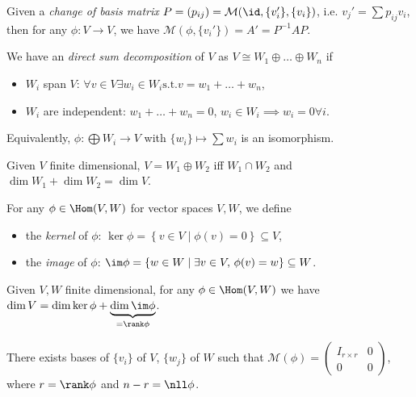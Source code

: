 \documentclass{notes}
\begin{document}
\begin{corollary}
    Given a \emph{change of basis matrix} $P=(p_{ij})=\mathcal{M} (\id, \{v_i'\}, \{v_i\})$, i.e. $v_j'=\sum p_{ij}v_i$, then for any $\phi \colon V \to V $, we have $\mathcal{M} (\phi ,\{v_i'\})=A'=P^{-1} AP $.
\end{corollary}

\begin{theorem}
    We have an \emph{direct sum decomposition} of $V$ as $V\cong W_1 \oplus \ldots \oplus W_n $ if

    \begin{itemize}
        \item $W_i$ span $V$: $\forall v\in V \exists w_i\in W_i \text{s.t.} v={w}_{1}+\ldots+{w}_{n} $,
        \item $W_i$ are independent: ${w}_{1}+\ldots+{w}_{n} =0$, $w_i\in W_i\implies w_i=0 \forall i$.
    \end{itemize}
    
    Equivalently, $\phi \colon \bigoplus W_i\to V$ with $\{w_i\}\mapsto \sum w_i$ is an isomorphism.
\end{theorem}

\begin{corollary}
    Given $V$ finite dimensional, $V=W_1\oplus W_2$ iff $W_1 \cap W_2$ and $\dim W_1+\dim W_2=\dim V$.
\end{corollary}

\begin{defn}
    For any $\phi \in \Hom(V,W)$ for vector spaces $V,W$, we define
    \begin{itemize}
        \item the \emph{kernel} of $\phi $: $\ker\phi =\left\{ v\in V\mid  \phi (v)=0 \right\}\subseteq V $,
        \item the \emph{image} of $\phi $: $\im\phi =\left\{ w\in W\mid  \exists v\in V,\, \phi (v)=w \right\}\subseteq W $. 
    \end{itemize}
\end{defn}

\begin{theorem}
    Given $V,W$ finite dimensional, for any $\phi \in \Hom(V,W)$ we have $\dim V=\dim\ker\phi +\underbrace{\dim\im\phi }_{=\rank\phi }$.
\end{theorem}

\begin{remark}
    There exists bases of $\{v_i\} $ of $V$, $\{w_j\} $ of $W$ such that $\mathcal{M} (\phi )=\begin{pmatrix} I_{r\times r} & 0 \\ 0 & 0 \end{pmatrix} $, where $r=\rank\phi $ and $n-r=\nll\phi $.
\end{remark}
\end{document}
